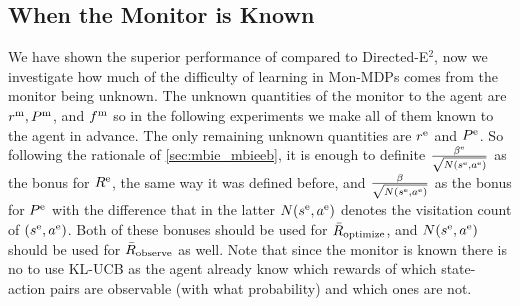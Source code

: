 \subsection{When the Monitor is Known}
\label{appendix:known_monitor}
We have shown the superior performance of \thealgo compared to Directed-E$^2$, now we investigate how much of the difficulty of learning in Mon-MDPs comes from the monitor being unknown. The unknown quantities of the monitor to the agent are $r^\text{m}, P^\text{m}$, and $f^\text{m}$ so in the following experiments we make all of them known to the agent in advance. The only remaining unknown quantities are $r^\text{e}$ and $P^\text{e}$. So following the rationale of \cref{sec:mbie_mbieeb}, it is enough to definite $\frac{\beta^\text{e}}{\sqrt{N(s^\text{e}, a^\text{e})}}$ as the bonus for $R^\text{e}$, the same way it was defined before, and $\frac{\beta}{\sqrt{N(s^\text{e}, a^\text{e})}}$ as the bonus for $P^\text{e}$ with the difference that in the latter $N(s^\text{e}, a^\text{e})$ denotes the visitation count of $(s^\text{e}, a^\text{e})$. Both of these bonuses should be used for $\bar{R}_{\text{optimize}}$, and $N(s^\text{e}, a^\text{e})$ should be used for $\bar{R}_{\text{observe}}$ as well. Note that since the monitor is known there is no to use KL-UCB as the agent already know which rewards of which state-action pairs are observable (with what probability) and which ones are not. 

